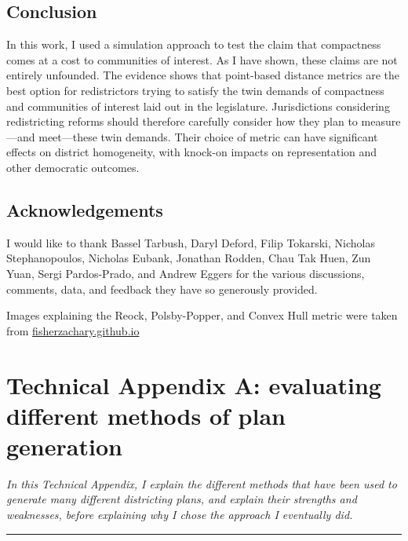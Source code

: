\documentclass[]{article}
\begin{document}
\hypertarget{conclusion}{%
\subsection{Conclusion}\label{conclusion}}

In this work, I used a simulation approach to test the claim that
compactness comes at a cost to communities of interest. As I have shown,
these claims are not entirely unfounded. The evidence shows that
point-based distance metrics are the best option for redistrictors
trying to satisfy the twin demands of compactness and communities of
interest laid out in the legislature. Jurisdictions considering
redistricting reforms should therefore carefully consider how they plan
to measure---and meet---these twin demands. Their choice of metric can
have significant effects on district homogeneity, with knock-on impacts
on representation and other democratic outcomes.

\hypertarget{acknowledgements}{%
\subsection{Acknowledgements}\label{acknowledgements}}

I would like to thank Bassel Tarbush, Daryl Deford, Filip Tokarski,
Nicholas Stephanopoulos, Nicholas Eubank, Jonathan Rodden, Chau Tak
Huen, Zun Yuan, Sergi Pardos-Prado, and Andrew Eggers for the various
discussions, comments, data, and feedback they have so generously
provided.

Images explaining the Reock, Polsby-Popper, and Convex Hull metric were
taken from
\href{https://fisherzachary.github.io/public/r-output.html}{fisherzachary.github.io}

\pagebreak{}

\hypertarget{technical-appendix-a-evaluating-different-methods-of-plan-generation}{%
\section{Technical Appendix A: evaluating different methods of plan
generation}\label{technical-appendix-a-evaluating-different-methods-of-plan-generation}}

\textsl{In this Technical Appendix, I explain the different methods that have been used
to generate many different districting plans, and explain their strengths and
weaknesses, before explaining why I chose the approach I eventually did.}

\begin{center}\rule{0.5\linewidth}{\linethickness}\end{center}
\end{document}
